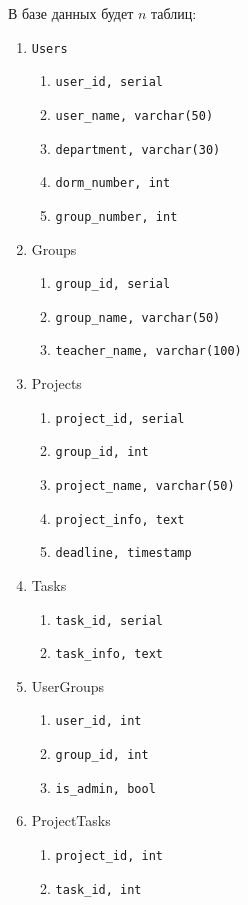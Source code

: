 \documentclass[12pt,a4paper,notitlepage]{article}
\begin{document}
В базе данных будет $n$ таблиц:
\begin{enumerate}
\item \texttt{Users}
    \begin{enumerate}
    \item \texttt{user\_id, serial}
    \item \texttt{user\_name, varchar(50)}
    \item \texttt{department, varchar(30)}
    \item \texttt{dorm\_number, int}
    \item \texttt{group\_number, int}
    \end{enumerate}
\item Groups
    \begin{enumerate}
    \item \texttt{group\_id, serial}
    \item \texttt{group\_name, varchar(50)}
    \item \texttt{teacher\_name, varchar(100)}
    \end{enumerate}
\item Projects
    \begin{enumerate}
    \item \texttt{project\_id, serial}
    \item \texttt{group\_id, int}
    \item \texttt{project\_name, varchar(50)}
    \item \texttt{project\_info, text}
    \item \texttt{deadline, timestamp}
    \end{enumerate}
\item Tasks
    \begin{enumerate}
    \item \texttt{task\_id, serial}
    \item \texttt{task\_info, text}
    \end{enumerate}
\item UserGroups
    \begin{enumerate}
    \item \texttt{user\_id, int}
    \item \texttt{group\_id, int}
    \item \texttt{is\_admin, bool}
    \end{enumerate}
\item ProjectTasks
    \begin{enumerate}
    \item \texttt{project\_id, int}
    \item \texttt{task\_id, int}

\end{enumerate}
\end{enumerate}
\end{document}

